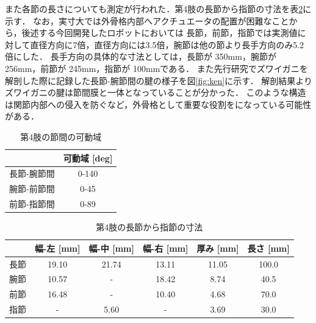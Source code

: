 また各節の長さについても測定が行われた．第4肢の長節から指節の寸法を表\ref{tab:4setu}に示す．
なお，実寸大では外骨格内部へアクチュエータの配置が困難なことから，後述する今回開発したロボットにおいては
長節，前節，指節では実測値に対して直径方向に7倍，直径方向には3.5倍，腕節は他の節より長手方向のみ5.2倍にした．
長手方向の具体的な寸法としては，長節が 350mm，腕節が 256mm，前節が 245mm，指節が 100mmである．
また先行研究\cite{hasegawa}でズワイガニを解剖した際に記録した長節-腕節間の腱の様子を図\ref{fig:ken}に示す．
解剖結果よりズワイガニの腱は節間膜と一体となっていることが分かった\cite{hasegawa}．
このような構造は関節内部への侵入を防ぐなど，外骨格として重要な役割をになっている可能性がある．
\begin{table}[ht]
  \centering
  \vspace{5mm}
  \caption{第4肢の節間の可動域}
  \label{tab:4setukadou}
  \vspace{-3mm}
  \begin{tabular}{|l|c|}
  \hline
         & \multicolumn{1}{l|}{可動域 {[}deg{]}} \\ \hline
  長節-腕節間 & 0-140                            \\ \hline
  腕節-前節間 & 0-45                             \\ \hline
  前節-指節間 & 0-89                            \\ \hline
  \end{tabular}
\end{table}
\begin{table}[ht]
  \centering
  \caption{第4肢の長節から指節の寸法}
  \label{tab:4setu}
  \vspace{-3mm}
  \begin{tabular}{|l|c|c|c|c|c|}
  \hline
     & \multicolumn{1}{l|}{幅-左 [mm]} & \multicolumn{1}{l|}{幅-中 [mm]} & \multicolumn{1}{l|}{幅-右 [mm]} & \multicolumn{1}{l|}{厚み [mm]} & \multicolumn{1}{l|}{長さ [mm]} \\ \hline
  長節 & 19.10                       & 21.74                       & 13.11                       & 11.05                       & 100.0                       \\ \hline
  腕節 & 10.57                       & -                           & 18.42                       & 8.74                        & 40.5                        \\ \hline
  前節 & 16.48                       & -                           & 10.40                       & 4.68                        & 70.0                        \\ \hline
  指節 & -                           & 5.60                        & -                           & 3.69                        & 30.0                        \\ \hline
  \end{tabular}
\end{table}
